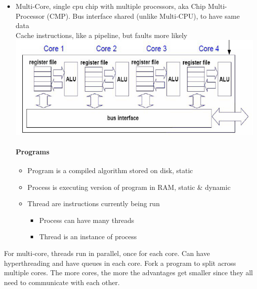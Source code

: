 \documentclass[12 pt]{article}
\begin{document}
\begin{itemize}
\item Multi-Core, single cpu chip with multiple processors, aka Chip Multi-Processor (CMP). Bus interface shared (unlike Multi-CPU), to have same data
\\ Cache instructions, like a pipeline, but faults more likely
\\ \includegraphics[scale=0.7]{mccc}
\paragraph{Programs}
\begin{itemize}
\item Program is a compiled algorithm stored on disk, static
\item Process is executing version of program in RAM, static \& dynamic
\item Thread are instructions currently being run
\begin{itemize}
\item Process can have many threads
\item Thread is an instance of process
\end{itemize}
\end{itemize}
\end{itemize}
For multi-core, threads run in parallel, once for each core. Can have hyperthreading and have queues in each core. Fork a program to split across multiple cores. The more cores, the more the advantages get smaller since they all need to communicate with each other.
\end{document}
